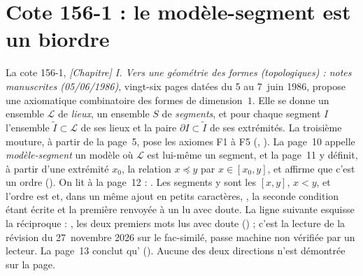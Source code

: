 \section[Cote 156-1 : le modèle-segment est un biordre]{Cote 156-1 : le modèle-segment est un biordre\protect{}}\label{sec:156-1}

La cote 156-1, \emph{[Chapitre] I. Vers une géométrie des formes (topologiques) : notes manuscrites (05/06/1986)}, vingt-six pages datées du 5 au 7~juin 1986, propose une axiomatique combinatoire des formes de dimension~$1$. Elle se donne un ensemble $\mathcal L$ de \emph{lieux}, un ensemble $S$ de \emph{segments}, et pour chaque segment $I$ l'ensemble $\widetilde I \subset \mathcal L$ de ses lieux et la paire $\partial I \subset \widetilde I$ de ses extrémités. La troisième mouture, à partir de la page~5, pose les axiomes F1 à F5 (, ). La page~10 appelle \emph{modèle-segment} un modèle où $\mathcal L$ est lui-même un segment, et la page~11 y définit, à partir d'une extrémité $x_0$, la relation $x \preccurlyeq y$ par $x \in [x_0, y]$, et affirme que c'est un ordre (). On lit à la page~12 : . Les segments y sont les $[x,y]$, $x<y$, et l'ordre est  et, dans un même ajout en petits caractères, , la seconde condition étant écrite et la première renvoyée à un  lu avec doute. La ligne suivante esquisse la réciproque : , les deux premiers mots lus avec doute () ; c'est la lecture de la révision du 27~novembre 2026 sur le fac-similé, passe machine non vérifiée par un lecteur. La page~13 conclut qu' (). Aucune des deux directions n'est démontrée sur la page.

